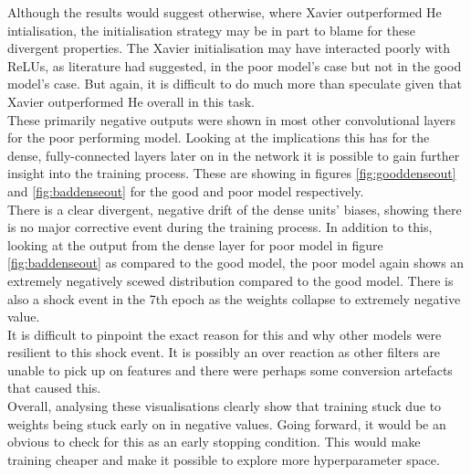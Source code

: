 \documentclass{article}
\begin{document}
{Although the results would suggest otherwise, where Xavier outperformed He intialisation, the initialisation strategy may be in part to blame for these divergent properties. The Xavier initialisation may have interacted poorly with ReLUs, as literature had suggested, in the poor model's case but not in the good model's case. But again, it is difficult to do much more than speculate given that Xavier outperformed He overall in this task. \\

These primarily negative outputs were shown in most other convolutional layers for the poor performing model. Looking at the implications this has for the dense, fully-connected layers later on in the network it is possible to gain further insight into the training process. These are showing in figures \ref{fig:gooddenseout} and \ref{fig:baddenseout} for the good and poor model respectively. \\

There is a clear divergent, negative drift of the dense units' biases, showing there is no major corrective event during the training process. In addition to this, looking at the output from the dense layer for poor model in figure \ref{fig:baddenseout} as compared to the good model, the poor model again shows an extremely negatively scewed distribution compared to the good model. There is also a shock event in the 7th epoch as the weights collapse to extremely negative value.\\

It is difficult to pinpoint the exact reason for this and why other models were resilient to this shock event. It is possibly an over reaction as other filters are unable to pick up on features and there were perhaps some conversion artefacts that caused this.\\

Overall, analysing these visualisations clearly show that training stuck due to weights being stuck early on in negative values. Going forward, it would be an obvious to check for this as an early stopping condition. This would make training cheaper and make it possible to explore more hyperparameter space.

}
\end{document}
